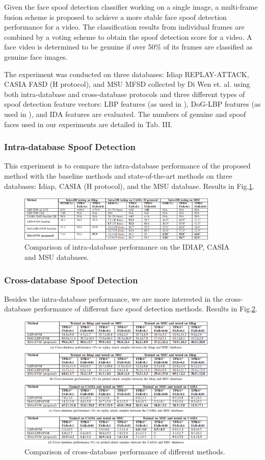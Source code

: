 \documentclass[journal]{IEEEtran}
\begin{document}
Given the face spoof detection classifier working on a single image, a multi-frame fusion scheme is proposed to achieve a more stable face spoof detection performance for a video. The classification results from individual frames are combined by a voting scheme to obtain the spoof detection score for a video. A face video is determined to be genuine if over 50\% of its frames are classified as genuine face images.

The experiment was conducted on three databases: Idiap REPLAY-ATTACK, CASIA FASD (H protocol), and MSU MFSD collected by Di Wen et. al. using both intra-database and cross-database protocols and three different types of spoof detection feature vectors: LBP features (as used in \cite{maatta2011face}), DoG-LBP features (as used in \cite{kose2012classification}), and IDA features are evaluated. The numbers of genuine and spoof faces used in our experiments are detailed in Tab. III.
\subsubsection{Intra-database Spoof Detection}
This experiment is to compare the intra-database performance of the proposed method with the baseline
methods and state-of-the-art methods on three databases: Idiap, CASIA (H protocol), and the MSU database.
Results in Fig.\ref{lda_intra}.
\begin{figure}[htbp]
\centering
\includegraphics[width=0.85\textwidth]{img/LDA_intra.PNG}
\caption{Comparison of intra-database performance on the IDIAP, CASIA and MSU databases.}
\label{lda_intra}
\end{figure}
\subsubsection{Cross-database Spoof Detection}
Besides the intra-database performance, we are more interested in the cross-database performance of different face spoof detection methods. Results in Fig.\ref{lda_cross}.
\begin{figure}[htbp]
\centering
\includegraphics[width=0.85\textwidth]{img/LDA_cross.PNG}
\caption{Comparison of cross-database performance of different methods.}
\label{lda_cross}
\end{figure}
\end{document}
